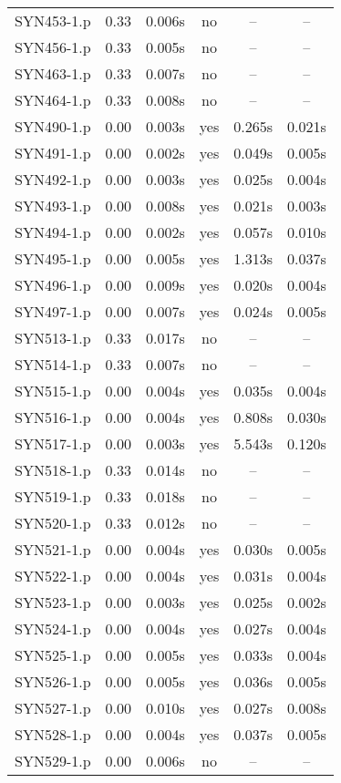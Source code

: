 \begin{longtable}{||c | c | c | c | c | c||}
SYN453-1.p & 0.33 & 0.006s & no & -- & -- \\
SYN456-1.p & 0.33 & 0.005s & no & -- & -- \\
SYN463-1.p & 0.33 & 0.007s & no & -- & -- \\
SYN464-1.p & 0.33 & 0.008s & no & -- & -- \\
SYN490-1.p & 0.00 & 0.003s & yes & 0.265s & 0.021s \\
SYN491-1.p & 0.00 & 0.002s & yes & 0.049s & 0.005s \\
SYN492-1.p & 0.00 & 0.003s & yes & 0.025s & 0.004s \\
SYN493-1.p & 0.00 & 0.008s & yes & 0.021s & 0.003s \\
SYN494-1.p & 0.00 & 0.002s & yes & 0.057s & 0.010s \\
SYN495-1.p & 0.00 & 0.005s & yes & 1.313s & 0.037s \\
SYN496-1.p & 0.00 & 0.009s & yes & 0.020s & 0.004s \\
SYN497-1.p & 0.00 & 0.007s & yes & 0.024s & 0.005s \\
SYN513-1.p & 0.33 & 0.017s & no & -- & -- \\
SYN514-1.p & 0.33 & 0.007s & no & -- & -- \\
SYN515-1.p & 0.00 & 0.004s & yes & 0.035s & 0.004s \\
SYN516-1.p & 0.00 & 0.004s & yes & 0.808s & 0.030s \\
SYN517-1.p & 0.00 & 0.003s & yes & 5.543s & 0.120s \\
SYN518-1.p & 0.33 & 0.014s & no & -- & -- \\
SYN519-1.p & 0.33 & 0.018s & no & -- & -- \\
SYN520-1.p & 0.33 & 0.012s & no & -- & -- \\
SYN521-1.p & 0.00 & 0.004s & yes & 0.030s & 0.005s \\
SYN522-1.p & 0.00 & 0.004s & yes & 0.031s & 0.004s \\
SYN523-1.p & 0.00 & 0.003s & yes & 0.025s & 0.002s \\
SYN524-1.p & 0.00 & 0.004s & yes & 0.027s & 0.004s \\
SYN525-1.p & 0.00 & 0.005s & yes & 0.033s & 0.004s \\
SYN526-1.p & 0.00 & 0.005s & yes & 0.036s & 0.005s \\
SYN527-1.p & 0.00 & 0.010s & yes & 0.027s & 0.008s \\
SYN528-1.p & 0.00 & 0.004s & yes & 0.037s & 0.005s \\
SYN529-1.p & 0.00 & 0.006s & no & -- & -- \\ 

\end{longtable}
